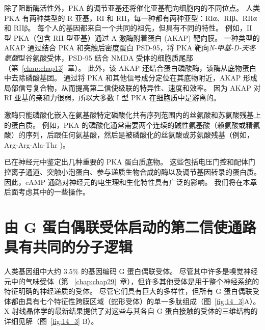 除了阻断酶活性外，PKA 的调节亚基还将催化亚基靶向细胞内的不同位点。
人类 PKA 有两种类型的 R 亚基，RI 和 RII，每一种都有两种亚型：RIα、RIβ、RIIα 和 RIIβ。
每个人的基因都来自一个共同的祖先，但具有不同的特性。
例如，II 型 PKA（包含 RII 型亚基）通过 A 激酶附着蛋白 (AKAP) 靶向膜。
一种类型的 AKAP 通过结合 PKA 和突触后密度蛋白 PSD-95，将 PKA 靶向\textit{N-甲基-D-天冬氨酸}型谷氨酸受体，PSD-95 结合 NMDA 受体的细胞质尾部（第~\ref{chap:chap13}~章）。
此外，该 AKAP 还结合蛋白磷酸酶，该酶从底物蛋白中去除磷酸基团。
通过将 PKA 和其他信号成分定位在其底物附近，AKAP 形成局部信号复合物，从而提高第二信使级联的特异性、速度和效率。
因为 AKAP 对 RI 亚基的亲和力很弱，所以大多数 I 型 PKA 在细胞质中是游离的。


激酶只能磷酸化嵌入在氨基酸特定磷酸化共有序列范围内的丝氨酸和苏氨酸残基上的蛋白质。
例如，PKA 的磷酸化通常需要两个连续的碱性氨基酸（赖氨酸或精氨酸）的序列，后跟任何氨基酸，然后是被磷酸化的丝氨酸或苏氨酸残基（例如，Arg-Arg-Ala-Thr )。


已在神经元中鉴定出几种重要的 PKA 蛋白质底物。
这些包括电压门控和配体门控离子通道、突触小泡蛋白、参与递质生物合成的酶以及调节基因转录的蛋白质。
因此，cAMP 通路对神经元的电生理和生化特性具有广泛的影响。
我们将在本章后面考虑其中的一些操作。



\section{由 G 蛋白偶联受体启动的第二信使通路具有共同的分子逻辑}

人类基因组中大约 3.5\% 的基因编码 G 蛋白偶联受体。
尽管其中许多是嗅觉神经元中的气味受体（第 ~\ref{chap:chap29}~章），但许多其他受体是用于整个神经系统的特征明确的神经递质的受体。
尽管它们具有巨大的多样性，但所有 G 蛋白偶联受体都由具有七个特征性跨膜区域（蛇形受体）的单一多肽组成（图~\ref{fig:14_3}A）。
X 射线晶体学的最新结果提供了对这些与其各自 G 蛋白接触的受体的三维结构的详细见解（图~\ref{fig:14_3} B）。


